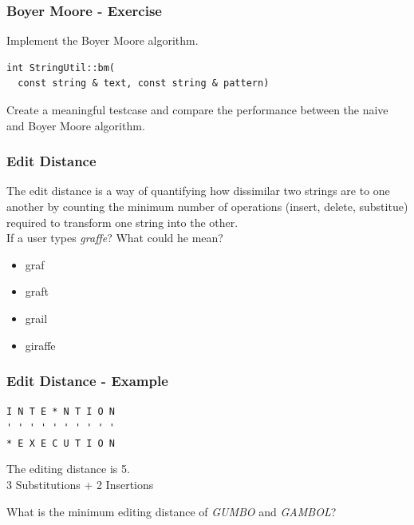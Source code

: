 \begin{frame}[fragile] 
\frametitle{Boyer Moore - Exercise}
\begin{exercise}
Implement the Boyer Moore algorithm.
\begin{lstlisting}
int StringUtil::bm(
  const string & text, const string & pattern)
\end{lstlisting}
\end{exercise}
\begin{exercise}
Create a meaningful testcase and compare the performance between the naive and Boyer Moore algorithm. 
\end{exercise}
\end{frame}

\begin{frame}[fragile]
\frametitle{Edit Distance}
The edit distance is a way of quantifying how dissimilar two strings are to one another by counting the minimum number of operations (insert, delete, substitue) required to transform one string into the other.\\
\vspace{3mm}
If a user types \emph{graffe}? What could he mean?
\begin{itemize}
\item graf
\item graft
\item grail
\item giraffe
\end{itemize}

\end{frame}

\begin{frame}[fragile]
\frametitle{Edit Distance - Example}
\verb|I N T E * N T I O N|\\
\verb|' ' ' ' ' ' ' ' ' '|\\
\verb|* E X E C U T I O N|\\
 
\vspace{3mm}

The editing distance is 5.\\
3 Substitutions + 2 Insertions\\

\vspace{3mm}

\begin{exercise}
What is the minimum editing distance of \emph{GUMBO} and \emph{GAMBOL}?
\end{exercise}

\end{frame}

